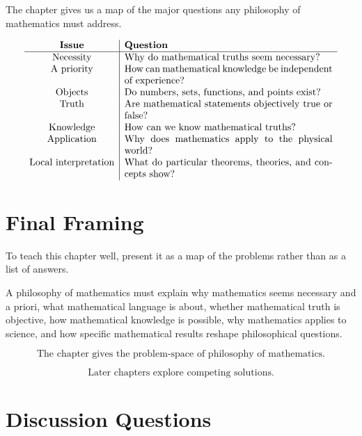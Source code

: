 \documentclass[11pt]{article}
\begin{document}
The chapter gives us a map of the major questions any philosophy of mathematics must
address.

\[
\begin{array}{c|p{0.62\textwidth}}
\textbf{Issue} & \textbf{Question} \\
\hline
\text{Necessity} &
Why do mathematical truths seem necessary? \\

\text{A priority} &
How can mathematical knowledge be independent of experience? \\

\text{Objects} &
Do numbers, sets, functions, and points exist? \\

\text{Truth} &
Are mathematical statements objectively true or false? \\

\text{Knowledge} &
How can we know mathematical truths? \\

\text{Application} &
Why does mathematics apply to the physical world? \\

\text{Local interpretation} &
What do particular theorems, theories, and concepts show?
\end{array}
\]

\section*{Final Framing}

To teach this chapter well, present it as a map of the problems rather than as a list of
answers.

A philosophy of mathematics must explain why mathematics seems necessary and
a priori, what mathematical language is about, whether mathematical truth is objective,
how mathematical knowledge is possible, why mathematics applies to science, and how
specific mathematical results reshape philosophical questions.

\[
\boxed{
\text{The chapter gives the problem-space of philosophy of mathematics.}
}
\]

\[
\boxed{
\text{Later chapters explore competing solutions.}
}
\]

\section*{Discussion Questions}
\end{document}

